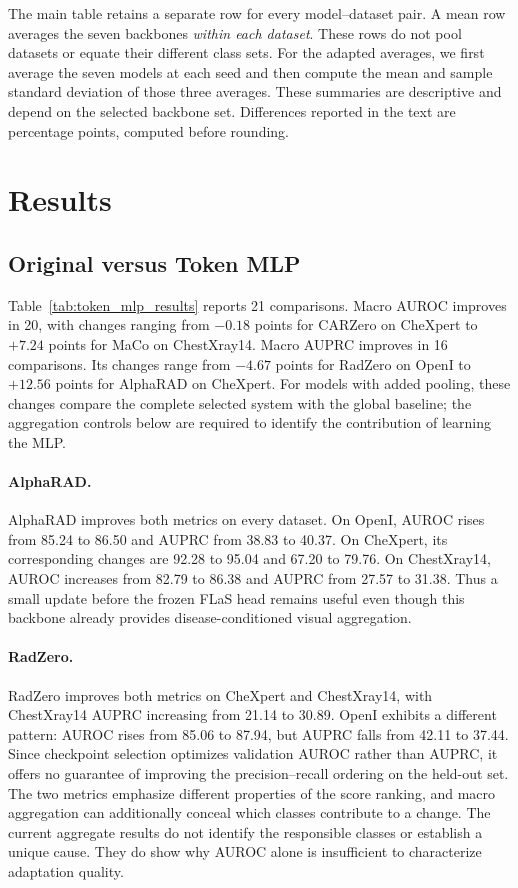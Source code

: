 \documentclass[10pt,twocolumn,letterpaper]{article}
\begin{document}
The main table retains a separate row for every model--dataset pair. A mean row averages the seven backbones \emph{within each dataset}. These rows do not pool datasets or equate their different class sets. For the adapted averages, we first average the seven models at each seed and then compute the mean and sample standard deviation of those three averages. These summaries are descriptive and depend on the selected backbone set. Differences reported in the text are percentage points, computed before rounding.

\section{Results}
\label{sec:results}


\subsection{Original versus Token MLP}
Table~\ref{tab:token_mlp_results} reports 21 comparisons. Macro AUROC improves in 20, with changes ranging from $-0.18$ points for CARZero on CheXpert to $+7.24$ points for MaCo on ChestXray14. Macro AUPRC improves in 16 comparisons. Its changes range from $-4.67$ points for RadZero on OpenI to $+12.56$ points for AlphaRAD on CheXpert. For models with added pooling, these changes compare the complete selected system with the global baseline; the aggregation controls below are required to identify the contribution of learning the MLP.

\paragraph{AlphaRAD.}
AlphaRAD improves both metrics on every dataset. On OpenI, AUROC rises from 85.24 to 86.50 and AUPRC from 38.83 to 40.37. On CheXpert, its corresponding changes are 92.28 to 95.04 and 67.20 to 79.76. On ChestXray14, AUROC increases from 82.79 to 86.38 and AUPRC from 27.57 to 31.38. Thus a small update before the frozen FLaS head remains useful even though this backbone already provides disease-conditioned visual aggregation.

\paragraph{RadZero.}
RadZero improves both metrics on CheXpert and ChestXray14, with ChestXray14 AUPRC increasing from 21.14 to 30.89. OpenI exhibits a different pattern: AUROC rises from 85.06 to 87.94, but AUPRC falls from 42.11 to 37.44. Since checkpoint selection optimizes validation AUROC rather than AUPRC, it offers no guarantee of improving the precision--recall ordering on the held-out set. The two metrics emphasize different properties of the score ranking, and macro aggregation can additionally conceal which classes contribute to a change. The current aggregate results do not identify the responsible classes or establish a unique cause. They do show why AUROC alone is insufficient to characterize adaptation quality.
\end{document}
